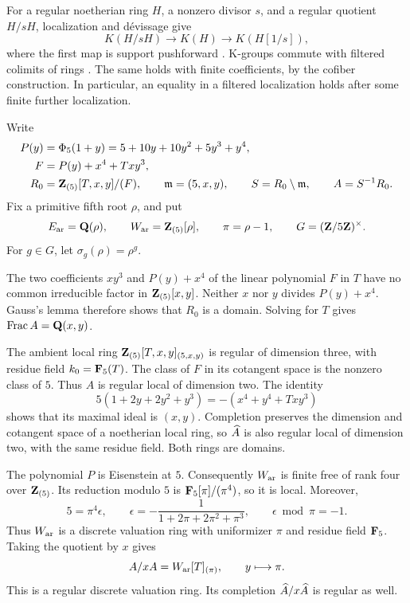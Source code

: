 For a regular noetherian ring \(H\), a nonzero divisor \(s\), and a
regular quotient \(H/sH\), localization and d\'evissage give
\[
 K(H/sH)\longrightarrow K(H)\longrightarrow K(H[1/s]),
\]
where the first map is support pushforward
\cite[V.4.1, V.6.1]{Weibel}.
K-groups commute with filtered colimits of rings
\cite[IV, Section~6.4]{Weibel}. The same holds with finite coefficients,
by the cofiber construction. In particular, an equality in a filtered
localization holds after some finite further localization.

\begin{setup}\label{d2:setup:ring}
Write
\[
 \begin{split}
 P(y)&=\Phi _5(1+y)=5+10y+10y^2+5y^3+y^4,\\
 F&=P(y)+x^4+Txy^3,\\
 R_0&=\mathbf{Z} _{(5)}[T,x,y]/(F),\qquad
 \mathfrak m=(5,x,y),\qquad
 S=R_0\setminus\mathfrak m,\qquad A=S^{-1}R_0.
 \end{split}
\]
Fix a primitive fifth root \(\rho\), and put
\[
 E_{\mathrm{ar}}=\mathbf{Q}(\rho),\qquad
 W_{\mathrm{ar}}=\mathbf{Z} _{(5)}[\rho],\qquad
 \pi=\rho-1,\qquad
 G=(\mathbf{Z}/5\mathbf{Z})^\times.
\]
For \(g\in G\), let \(\sigma_g(\rho)=\rho^g\).
\end{setup}

The two coefficients \(xy^3\) and \(P(y)+x^4\) of the linear polynomial
\(F\) in \(T\) have no common irreducible factor in
\(\mathbf{Z} _{(5)}[x,y]\). Neither \(x\) nor \(y\) divides \(P(y)+x^4\).
Gauss's lemma therefore shows that \(R_0\) is a domain.
Solving for \(T\) gives \(\operatorname{Frac} A=\mathbf{Q}(x,y)\).

The ambient local ring
\(\mathbf{Z} _{(5)}[T,x,y]_{(5,x,y)}\) is regular of dimension three,
with residue field \(k_0=\mathbf{F} _5(T)\).
The class of \(F\) in its cotangent space is the nonzero class of \(5\).
Thus \(A\) is regular local of dimension two. The identity
\begin{equation}\label{d2:eq:ramification}
 5(1+2y+2y^2+y^3)=-(x^4+y^4+Txy^3)
\end{equation}
shows that its maximal ideal is \((x,y)\).
Completion preserves the dimension and cotangent space of a noetherian
local ring, so \(\widehat A\) is also regular local of dimension two, with the
same residue field. Both rings are domains.

The polynomial \(P\) is Eisenstein at \(5\).
Consequently \(W_{\mathrm{ar}}\) is finite free of rank four over
\(\mathbf{Z} _{(5)}\). Its reduction modulo \(5\) is
\(\mathbf{F} _5[\pi]/(\pi^4)\), so it is local.
Moreover,
\begin{equation}\label{d2:eq:epsilon}
 5=\pi^4\epsilon,\qquad
 \epsilon=-\frac{1}{1+2\pi+2\pi^2+\pi^3},
 \qquad
 \epsilon\bmod\pi=-1.
\end{equation}
Thus \(W_{\mathrm{ar}}\) is a discrete valuation ring with uniformizer \(\pi\)
and residue field \(\mathbf{F} _5\). Taking the quotient by \(x\) gives
\begin{equation}\label{d2:eq:cartier-quotient}
 A/xA=W_{\mathrm{ar}}[T]_{(\pi)},
 \qquad y\longmapsto\pi.
\end{equation}
This is a regular discrete valuation ring. Its completion
\(\widehat A/x\widehat A\) is regular as well.

